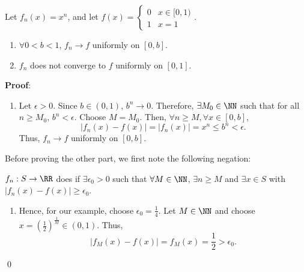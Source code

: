 
\begin{theorem}
Let $f_n(x) = x^n$, and let $f(x) = \begin{cases}0&x\in [0,1) \\ 1& x=1\end{cases}.$ 
\begin{enumerate}
    \item $\forall 0 < b<1$, $f_n\to f$ uniformly on $[0,b]$.
    \item $f_n$ does not converge to $f$ uniformly on $[0,1]$.
\end{enumerate}
\end{theorem}
\textbf{Proof}:
\begin{enumerate}
    \item Let $\epsilon>0$. Since $b\in (0,1)$, $b^n \to 0$. Therefore, $\exists M_0\in \NN$ such that for all $n\geq M_0$, $b^n < \epsilon$. Choose $M = M_0$. Then, $\forall n\geq M, \forall x\in [0,b]$,
    \[
    |f_n(x) - f(x)| = |f_n(x)| = x^n \leq b^n<\epsilon.
    \]
    Thus, $f_n\to f$ uniformly on $[0,b]$.
\end{enumerate}
Before proving the other part, we first note the following negation:
\begin{negation}
$f_n:S\to \RR$ does  if $\exists \epsilon_0>0$ such that $\forall M\in\NN$, $\exists n\geq M$ and $\exists x\in S$ with $|f_n(x) - f(x)|\geq \epsilon_0$.
\end{negation}
\begin{enumerate}
    \item[2.] Hence, for our example, choose $\epsilon_0 = \frac{1}{4}$. Let $M\in\NN$ and choose $x = \left(\frac{1}{2}\right)^{\frac{1}{M}}\in (0,1)$. Thus, 
    \[
    |f_M(x) - f(x)| = f_M(x) = \frac{1}{2} >\epsilon_0.
    \]
\end{enumerate}
\qed 

